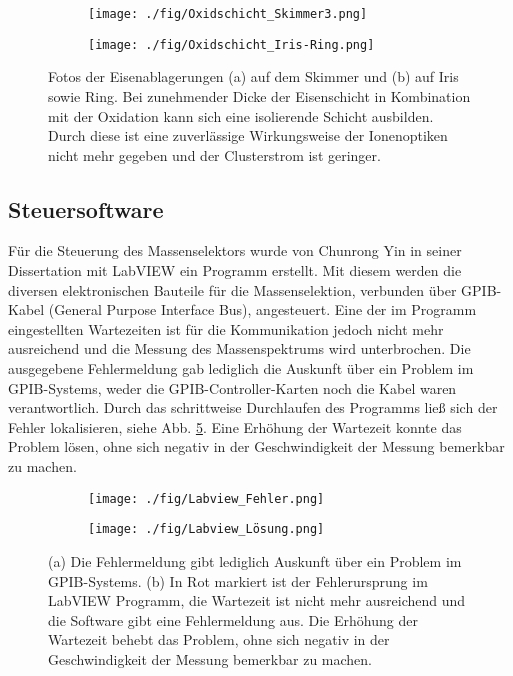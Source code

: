 \begin{figure}
  \begin{subfigure}[h]{0.37\textwidth}
    \texttt{[image: ./fig/Oxidschicht\_Skimmer3.png]}
    \caption{}
    \label{fig:Oxidschicht_Skimmer}
  \end{subfigure}
  \begin{subfigure}[h]{0.525\textwidth}
    \texttt{[image: ./fig/Oxidschicht\_Iris-Ring.png]}
    \caption{}
    \label{fig:Oxidschicht_Iris-Ring}
  \end{subfigure}
  \caption{Fotos der Eisenablagerungen (a) auf dem Skimmer und (b) auf Iris sowie Ring. Bei zunehmender Dicke der Eisenschicht in Kombination mit der Oxidation kann sich eine isolierende Schicht ausbilden. Durch diese ist eine zuverlässige Wirkungsweise der Ionenoptiken nicht mehr gegeben und der Clusterstrom ist geringer.}
  \label{fig:oxidschicht}
\end{figure}
\subsection{Steuersoftware}
Für die Steuerung des Massenselektors wurde von Chunrong Yin in seiner Dissertation \cite{Yin.2007} mit LabVIEW ein Programm erstellt.
Mit diesem werden die diversen elektronischen Bauteile für die Massenselektion, verbunden über GPIB-Kabel (General Purpose Interface Bus), angesteuert.
Eine der im Programm eingestellten Wartezeiten ist für die Kommunikation jedoch nicht mehr ausreichend und die Messung des Massenspektrums wird unterbrochen.
Die ausgegebene Fehlermeldung gab lediglich die Auskunft über ein Problem im GPIB-Systems, weder die GPIB-Controller-Karten noch die Kabel waren verantwortlich.
Durch das schrittweise Durchlaufen des Programms ließ sich der Fehler lokalisieren, siehe Abb. \ref{fig:Labview_Fehlerloesung}.
Eine Erhöhung der Wartezeit konnte das Problem lösen, ohne sich negativ in der Geschwindigkeit der Messung bemerkbar zu machen.

\begin{figure}
  \begin{subfigure}{0.9\textwidth}
    \texttt{[image: ./fig/Labview\_Fehler.png]}
    \caption{}
    \label{fig:Labview_Fehler}
  \end{subfigure}
  \begin{subfigure}{0.9\textwidth}
    \texttt{[image: ./fig/Labview\_Lösung.png]}
    \caption{}
    \label{fig:Labview_Fehlerloesung}
  \end{subfigure}
  \caption{(a) Die Fehlermeldung gibt lediglich Auskunft über ein Problem im GPIB-Systems. (b) In Rot markiert ist der Fehlerursprung im LabVIEW Programm, die Wartezeit ist nicht mehr ausreichend und die Software gibt eine Fehlermeldung aus. Die Erhöhung der Wartezeit behebt das Problem, ohne sich negativ in der Geschwindigkeit der Messung bemerkbar zu machen.}
  \label{fig:labview}
\end{figure}

